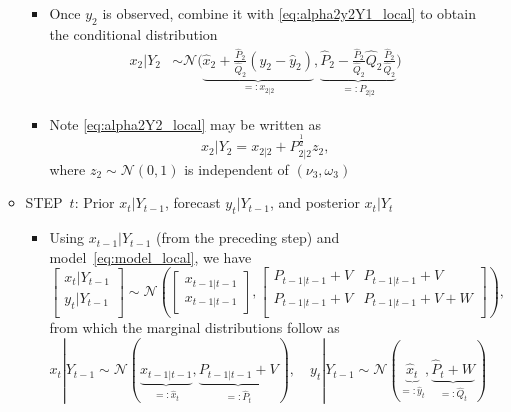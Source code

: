 \documentclass[12pt,a4paper]{article}
\begin{document}
\begin{itemize}
\begin{itemize}
\begin{itemize}
    \item Once $y_{2}$ is observed,
      combine it with \eqref{eq:alpha2y2Y1_local}
      to obtain the conditional distribution
      \begin{align}
        x_{2}|Y_{2}
        & \sim
          \mathcal{N} \bigg(
          \underbrace{\hat{x}_{2} + \frac{\hat{P}_{2}}{\hat{Q}_{2}}(y_{2}-\hat{y}_{2})}_{=:x_{2|2}},
          \underbrace{\hat{P}_{2} - \frac{\hat{P}_{2}}{\hat{Q}_{2}}\hat{Q}_{2}\frac{\hat{P}_{2}}{\hat{Q}_{2}}}_{=:P_{2|2}}
          \bigg)
          \label{eq:alpha2Y2_local}%
      \end{align}

    \item Note \eqref{eq:alpha2Y2_local} may be written as
      \begin{equation}\label{eq:alpha2Y2z_local}%
        x_{2}|Y_{2} = x_{2|2} + P_{2|2}^{\frac{1}{2}}z_{2},
      \end{equation}
      where $z_{2}\sim \mathcal{N}(0,1)$ is independent of
      $(\nu_{3},\omega_{3})$

    \end{itemize}

  \item STEP~$t$: Prior $x_{t}|Y_{t-1}$, forecast $y_{t}|Y_{t-1}$, and posterior $x_{t}|Y_{t}$

    \begin{itemize}

    \item Using $x_{t-1}|Y_{t-1}$ (from the preceding step) and model~\eqref{eq:model_local},
      we have
      \begin{equation}\label{eq:alphatytYtm1}%
        \begin{bmatrix}
          x_{t}|Y_{t-1}\\
          y_{t}|Y_{t-1}\\
        \end{bmatrix}
        \sim 
        \mathcal{N}
        \left(
          \begin{bmatrix}
            x_{t-1|t-1}\\
            x_{t-1|t-1}
          \end{bmatrix},
        \begin{bmatrix}
          P_{t-1|t-1} + V & P_{t-1|t-1} + V\\
          P_{t-1|t-1} + V & P_{t-1|t-1}+ V + W\\
        \end{bmatrix}
        \right),
      \end{equation}
      from which the marginal distributions follow as
      \begin{equation}\label{eq:alphatYtm1}%
        x_{t}|Y_{t-1} 
        \sim
        \mathcal{N}(\underbrace{x_{t-1|t-1}}_{=:\hat{x}_{t}},\underbrace{P_{t-1|t-1} + V}_{=:\hat{P}_{t}}),
        \quad
        y_{t}|Y_{t-1} 
        \sim 
        \mathcal{N}(\underbrace{\hat{x}_{t}}_{=:\hat{y}_{t}},\underbrace{\hat{P}_{t} + W}_{=:\hat{Q}_{t}})
      \end{equation}


\end{itemize}
\end{itemize}
\end{itemize}
\end{document}
